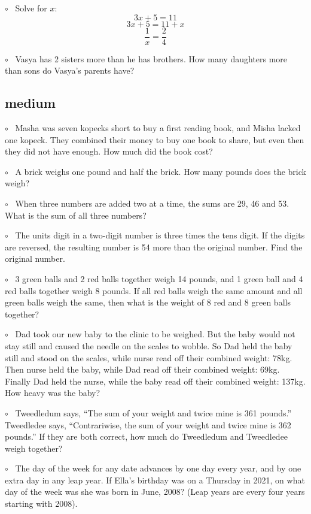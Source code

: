 \documentclass[11pt, oneside]{article}
\begin{document}
$\circ$ \ Solve for $x$:
\[ 3x + 5 = 11 \]
\[ 3x + 5 = 11 + x \]
\[ \frac{1}{x} = \frac{2}{4} \]

$\circ$ \ Vasya has 2 sisters more than he has brothers. How many daughters more than sons do Vasya’s parents have?

\subsection*{medium}

$\circ$ \ Masha was seven kopecks short to buy a first reading book, and Misha lacked one kopeck. They combined their money to buy one book to share, but even then they did not have enough. How much did the book cost?

$\circ$ \ A brick weighs one pound and half the brick. How many pounds does the brick weigh?

$\circ$ \ When three numbers are added two at a time, the sums are 29, 46 and 53.  What is the sum of all three numbers?

$\circ$ \ The units digit in a two-digit number is three times the tens digit.  If the digits are reversed, the resulting number is 54 more than the original number.  Find the original number.

$\circ$ \ 3 green balls and 2 red balls together weigh 14 pounds, and 1 green ball and 4 red balls together weigh 8 pounds. If all red balls weigh the same amount and all green balls weigh the same, then what is the weight of 8 red and 8 green balls together?

$\circ$ \ Dad took our new baby to the clinic to be weighed. But the baby would not stay still and caused the needle on the scales to wobble. So Dad held the baby still and stood on the scales, while nurse read off their combined weight: 78kg. Then nurse held the baby, while Dad read off their combined weight: 69kg. Finally Dad held the nurse, while the baby read off their combined weight: 137kg. How heavy was the baby?

$\circ$ \ Tweedledum says, “The sum of your weight and twice mine is 361 pounds.” Tweedledee says, “Contrariwise, the sum of your weight and twice mine is 362 pounds.” If they are both correct, how much do Tweedledum and Tweedledee weigh together?

$\circ$ \ The day of the week for any date advances by one day every year, and by one extra day in any leap year.  If Ella's birthday was on a Thursday in 2021, on what day of the week was she was born in June, 2008?  (Leap years are every four years starting with 2008).
\end{document}

